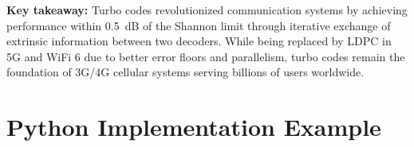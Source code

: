 \textbf{Key takeaway:} Turbo codes revolutionized communication systems by achieving performance within 0.5~dB of the Shannon limit through iterative exchange of extrinsic information between two decoders. While being replaced by LDPC in 5G and WiFi 6 due to better error floors and parallelism, turbo codes remain the foundation of 3G/4G cellular systems serving billions of users worldwide.

\section{Python Implementation Example}

\begin{Shaded}
\begin{Highlighting}[]

\OperatorTok{=}\NormalTok{[}\NormalTok{,}\NormalTok{,}\NormalTok{], g\_ff}\OperatorTok{=}\NormalTok{[}\NormalTok{,}\NormalTok{,}\NormalTok{]):}
\OperatorTok{=} 
\OperatorTok{=} 
\OperatorTok{=}\NormalTok{ []}
\OperatorTok{=}\NormalTok{ []}
    
\OperatorTok{=}
         \NormalTok{(}
            \OperatorTok{\&}\NormalTok{ (} \OperatorTok{\textless{}\textless{}}\OperatorTok{{-}}\NormalTok{))):}
\OperatorTok{\^{}=} 
        
\OperatorTok{=} 
         
            \OperatorTok{==} \NormalTok{:}
                \NormalTok{ g\_ff[}\NormalTok{]:}
\OperatorTok{\^{}=}
            \NormalTok{:}
                \OperatorTok{\&}\NormalTok{ (} \OperatorTok{\textless{}\textless{}}\OperatorTok{{-}}\NormalTok{))):}
\OperatorTok{\^{}=} 
        

\end{Highlighting}
\end{Shaded}
